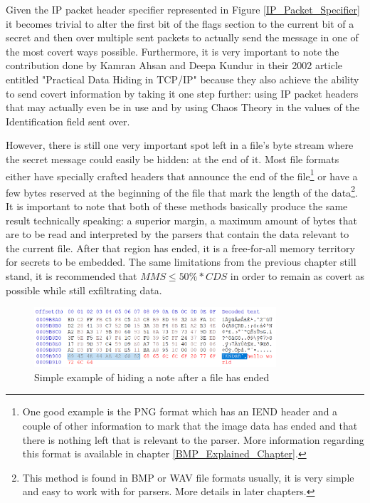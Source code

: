 \begin{multicols*}{2}
Given the IP packet header specifier represented in Figure \ref{IP_Packet_Specifier} it becomes trivial to alter the first bit of the flags section to the current bit of a secret and then over multiple sent packets to actually send the message in one of the most covert ways possible. Furthermore, it is very important to note the contribution done by Kamran Ahsan and Deepa Kundur in their 2002 article entitled "Practical Data Hiding in TCP/IP"\cite{practical_data_hiding_tcp_ip} because they also achieve the ability to send covert information by taking it one step further: using IP packet headers that may actually even be in use and by using Chaos Theory in the values of the Identification field sent over.

However, there is still one very important spot left in a file's byte stream where the secret message could easily be hidden: at the end of it. Most file formats either have specially crafted headers that announce the end of the file\footnote{One good example is the PNG format which has an IEND header and a couple of other information to mark that the image data has ended and that there is nothing left that is relevant to the parser. More information regarding this format is available in chapter \ref{BMP_Explained_Chapter}.} or have a few bytes reserved at the beginning of the file that mark the length of the data\footnote{This method is found in BMP or WAV file formats usually, it is very simple and easy to work with for parsers. More details in later chapters.}. It is important to note that both of these methods basically produce the same result technically speaking: a superior margin, a maximum amount of bytes that are to be read and interpreted by the parsers that contain the data relevant to the current file. After that region has ended, it is a free-for-all memory territory for secrets to be embedded. The same limitations from the previous chapter still stand, it is recommended that $MMS \leq  50\% * CDS$ in order to remain as covert as possible while still exfiltrating data.

\begin{figure}[H]
    \centering
    \includegraphics[width=9cm,keepaspectratio]{pics/secret_after_file_ended}
    \caption{Simple example of hiding a note after a file has ended}
    \label{secret_after_file_ended}
\end{figure}



\end{multicols*}